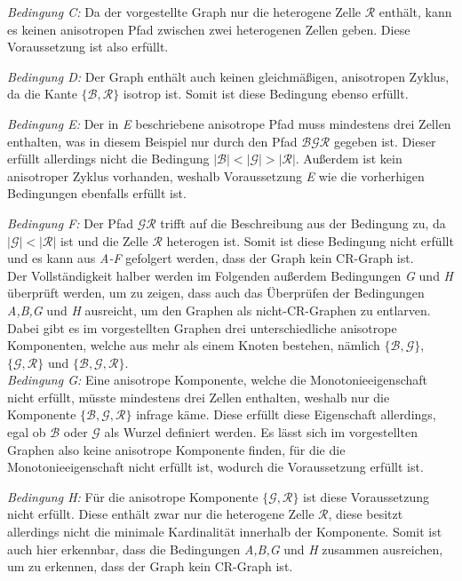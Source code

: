 \emph{Bedingung C:} Da der vorgestellte Graph nur die heterogene Zelle $\mathcal{R}$ enthält, kann es keinen anisotropen Pfad zwischen zwei heterogenen Zellen geben.
Diese Voraussetzung ist also erfüllt.

\emph{Bedingung D:} Der Graph enthält auch keinen gleichmäßigen, anisotropen Zyklus, da die Kante $\{\mathcal{B},\mathcal{R}\}$ isotrop ist.
Somit ist diese Bedingung ebenso erfüllt.

\emph{Bedingung E:} Der in \emph{E} beschriebene anisotrope Pfad muss mindestens drei Zellen enthalten, was in diesem Beispiel nur durch den Pfad $\mathcal{B}\mathcal{G}\mathcal{R}$ gegeben ist.
Dieser erfüllt allerdings nicht die Bedingung $|\mathcal{B}|<|\mathcal{G}|>|\mathcal{R}|$.
Außerdem ist kein anisotroper Zyklus vorhanden, weshalb Voraussetzung \emph{E} wie die vorherhigen Bedingungen ebenfalls erfüllt ist.

\emph{Bedingung F:} Der Pfad $\mathcal{G}\mathcal{R}$ trifft auf die Beschreibung aus der Bedingung zu, da $|\mathcal{G}|<|\mathcal{R}|$ ist und die Zelle $\mathcal{R}$ heterogen ist.
Somit ist diese Bedingung nicht erfüllt und es kann aus \emph{A-F} gefolgert werden, dass der Graph kein CR-Graph ist.\\

Der Vollständigkeit halber werden im Folgenden außerdem Bedingungen \emph{G} und \emph{H} überprüft werden, um zu zeigen, dass auch das Überprüfen der Bedingungen \emph{A,B,G} und \emph{H} ausreicht, um den Graphen als nicht-CR-Graphen zu entlarven.
Dabei gibt es im vorgestellten Graphen drei unterschiedliche anisotrope Komponenten, welche aus mehr als einem Knoten bestehen, nämlich $\{\mathcal{B},\mathcal{G}\}$, $\{\mathcal{G},\mathcal{R}\}$ und $\{\mathcal{B},\mathcal{G},\mathcal{R}\}$.\\

\emph{Bedingung G:} Eine anisotrope Komponente, welche die Monotonieeigenschaft nicht erfüllt, müsste mindestens drei Zellen enthalten, weshalb nur die Komponente $\{\mathcal{B},\mathcal{G},\mathcal{R}\}$ infrage käme.
Diese erfüllt diese Eigenschaft allerdings, egal ob $\mathcal{B}$ oder $\mathcal{G}$ als Wurzel definiert werden.
Es lässt sich im vorgestellten Graphen also keine anisotrope Komponente finden, für die die Monotonieeigenschaft nicht erfüllt ist, wodurch die Voraussetzung erfüllt ist.

\emph{Bedingung H:} Für die anisotrope Komponente $\{\mathcal{G},\mathcal{R}\}$ ist diese Voraussetzung nicht erfüllt.
Diese enthält zwar nur die heterogene Zelle $\mathcal{R}$, diese besitzt allerdings nicht die minimale Kardinalität innerhalb der Komponente.
Somit ist auch hier erkennbar, dass die Bedingungen \emph{A,B,G} und \emph{H} zusammen ausreichen, um zu erkennen, dass der Graph kein CR-Graph ist.

